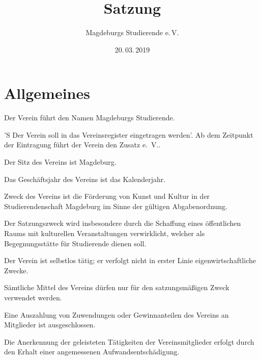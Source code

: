 \documentclass[%
    parskip=half,
]{scrartcl}
\begin{document}
\title{Satzung}
\author{Magdeburgs Studierende e.\,V.}
\date{20.\,03.\,2019}

\maketitle

\tableofcontents

\clearpage

\appendix

\section{Allgemeines}

\begin{contract}


Der Verein führt den Namen \glqq Magdeburgs Studierende\grqq .

'S Der Verein soll in das Vereinsregister eingetragen werden'.
Ab dem Zeitpunkt der Eintragung führt der Verein den Zusatz \glqq e.~V.\grqq .

Der Sitz des Vereins ist Magdeburg.


Das Geschäftsjahr des Vereins ist das Kalenderjahr.


Zweck des Vereins ist die Förderung von Kunst und Kultur in der Studierendenschaft Magdeburg im Sinne der gültigen Abgabenordnung.

Der Satzungszweck wird insbesondere durch die Schaffung eines öffentlichen Raums mit kulturellen Veranstaltungen verwirklicht, welcher als Begegnungsstätte für Studierende dienen soll.


Der Verein ist selbstlos tätig; er verfolgt nicht in erster Linie eigenwirtschaftliche Zwecke.


Sämtliche Mittel des Vereins dürfen nur für den satzungsmäßigen Zweck verwendet werden.

Eine Auszahlung von Zuwendungen oder Gewinnanteilen des Vereins an Mitglieder ist ausgeschlossen.

Die Anerkennung der geleisteten Tätigkeiten der Vereinsmitglieder erfolgt durch den Erhalt einer angemessenen Aufwandsentschädigung.


\end{contract}
\end{document}
